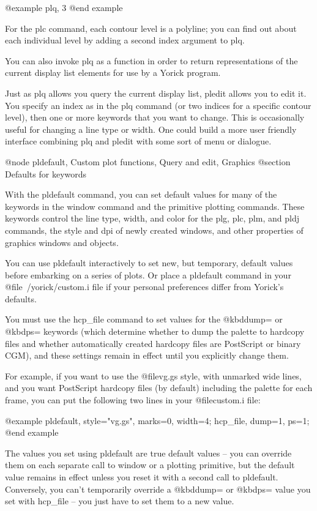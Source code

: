 @example
plq, 3
@end example

For the plc command, each contour level is a polyline; you can find
out about each individual level by adding a second index argument to
plq.

You can also invoke plq as a function in order to return
representations of the current display list elements for use by a
Yorick program.

Just as plq allows you query the current display list, pledit allows
you to edit it.  You specify an index as in the plq command (or two
indices for a specific contour level), then one or more keywords that
you want to change.  This is occasionally useful for changing a line
type or width.  One could build a more user friendly interface
combining plq and pledit with some sort of menu or dialogue.

@node pldefault, Custom plot functions, Query and edit, Graphics
@section Defaults for keywords

With the pldefault command, you can set default values for many of the
keywords in the window command and the primitive plotting commands.
These keywords control the line type, width, and color for the plg,
plc, plm, and pldj commands, the style and dpi of newly created
windows, and other properties of graphics windows and objects.

You can use pldefault interactively to set new, but temporary, default
values before embarking on a series of plots.  Or place a pldefault
command in your @file{~/yorick/custom.i} file if your personal
preferences differ from Yorick's defaults.

You must use the hcp_file command to set values for the @kbd{dump=} or
@kbd{ps=} keywords (which determine whether to dump the palette to
hardcopy files and whether automatically created hardcopy files are
PostScript or binary CGM), and these settings remain in effect until you
explicitly change them.

For example, if you want to use the @file{vg.gs} style, with unmarked
wide lines, and you want PostScript hardcopy files (by default)
including the palette for each frame, you can put the following two
lines in your @file{custom.i} file:

@example
pldefault, style="vg.gs", marks=0, width=4;
hcp_file, dump=1, ps=1;
@end example

The values you set using pldefault are true default values -- you can
override them on each separate call to window or a plotting primitive,
but the default value remains in effect unless you reset it with a
second call to pldefault.  Conversely, you can't temporarily override a
@kbd{dump=} or @kbd{ps=} value you set with hcp_file -- you just have to
set them to a new value.

